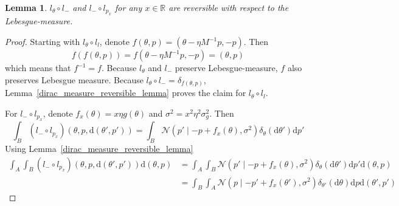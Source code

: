 \documentclass[english,twoside,openright]{HYgraduMLDS}
\newtheorem{lemma}{Lemma}
\newcommand{\R}{\mathbb{R}}
\newcommand{\dx}{\mathrm{d}}
\newcommand{\caln}{{\mathcal{N}}}
\begin{document}
\begin{lemma}\label{leapfrog_step_reversible_lemma}
  \(l_{\theta}\circ l_{-}\) and \(l_{-}\circ l_{p_{x}}\) for any \(x\in \R\)
  are reversible with respect to the Lebesgue-measure.
\end{lemma}
\begin{proof}
  Starting with \(l_{\theta}\circ l_{l}\), denote
  \(f(\theta, p) = (\theta - \eta M^{-1}p, -p)\). Then
  \[
    f(f(\theta, p)) = f(\theta - \eta M^{-1}p, -p) = (\theta, p)
  \]
  which means that \(f^{-1} = f\). Because \(l_{\theta}\) and \(l_{-}\) preserve
  Lebesgue-measure, \(f\) also preserves Lebesgue measure.
  Because \(l_{\theta}\circ l_{-} = \delta_{f(\theta, p)}\),
  Lemma~\ref{dirac_measure_reversible_lemma} proves the claim for
  \(l_{\theta}\circ l_{l}\).

  For \(l_{-}\circ l_{p_{x}}\), denote \(f_{x}(\theta) = x\eta g(\theta)\) and
  \(\sigma^{2} = x^{2}\eta^{2}\sigma_{g}^{2}\). Then
  \[
    \int_{B}(l_{-}\circ l_{p_{x}})(\theta, p, \dx(\theta', p')) =
    \int_{B}\caln(p'\mid -p + f_{x}(\theta), \sigma^{2})\delta_{\theta}(\dx \theta')\dx p'
  \]
  Using Lemma~\ref{dirac_measure_reversible_lemma}
	\begin{align*}
    \int_{A}\int_{B}(l_{-}\circ l_{p_{x}})(\theta, p, \dx(\theta', p'))\dx(\theta, p)
    &= \int_{A}\int_{B}\caln(p'\mid -p + f_{x}(\theta), \sigma^{2})
      \delta_{\theta}(\dx \theta')\dx p'\dx(\theta, p)
    \\&= \int_{B}\int_{A}\caln(p\mid -p' + f_{x}(\theta'), \sigma^{2})
      \delta_{\theta'}(\dx \theta)\dx p\dx(\theta', p')

\end{align*}
\end{proof}
\end{document}
